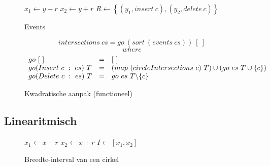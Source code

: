 \begin{figure}[H]
  \begin{algorithm}[H]
    $x_1 \leftarrow  y - r$\;
    $x_2 \leftarrow  y + r$\;
    $R \leftarrow \left\{(y_1, insert\ c), (y_2, delete\ c)\right\}$\;
    \caption{Events}
  \end{algorithm}
\end{figure}

\begin{figure}[H]
\[
intersections\ cs = go\ (sort\ (events\ cs))\ [\ ]
\]
\[
where 
\]
\[
\begin{array}{l c l}
go\ [\ ] &= &[\ ]\\
go (Insert\ c\ :\ es)\ T &= &(map\ (circleIntersections\ c)\ T) \cup (go\ es\ T\cup\{c\})\\
go (Delete\ c\ :\ es)\ T &= &go\ es\ T\backslash\{c\}\\
\end{array}
\]
\label{kwadratisch_functioneel}
\caption{Kwadratische aanpak (functioneel)}
\end{figure}





\subsection{Linearitmisch}

\begin{figure}[H]
  \begin{algorithm}[H]
    $x_1 \leftarrow x - r$\;
    $x_2 \leftarrow x + r$\;
    $I \leftarrow [x_1, x_2]$\;
    \caption{Breedte-interval van een cirkel}
  \end{algorithm}
  \label{algo:interval}
\end{figure}

